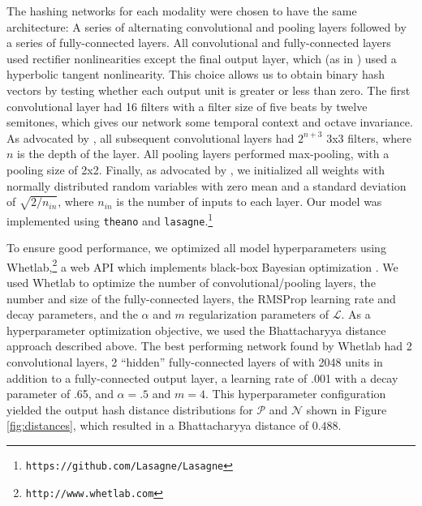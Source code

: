 \documentclass{article}
\begin{document}
The hashing networks for each modality were chosen to have the same architecture: A series of alternating convolutional and pooling layers followed by a series of fully-connected layers.
All convolutional and fully-connected layers used rectifier nonlinearities except the final output layer, which (as in \cite{masci2014multimodal}) used a hyperbolic tangent nonlinearity.
This choice allows us to obtain binary hash vectors by testing whether each output unit is greater or less than zero.
The first convolutional layer had 16 filters with a filter size of five beats by twelve semitones, which gives our network some temporal context and octave invariance.
As advocated by \cite{simonyan2014very}, all subsequent convolutional layers had $2^{n + 3}$ 3x3 filters, where $n$ is the depth of the layer.
All pooling layers performed max-pooling, with a pooling size of 2x2.
Finally, as advocated by \cite{he2015delving}, we initialized all weights with normally distributed random variables with zero mean and a standard deviation of $\sqrt{2/n_{in}}$, where $n_{in}$ is the number of inputs to each layer.
Our model was implemented using \texttt{theano} \cite{bastien2012theano} and \texttt{lasagne}.\footnote{\texttt{https://github.com/Lasagne/Lasagne}}

To ensure good performance, we optimized all model hyperparameters using Whetlab,\footnote{\texttt{http://www.whetlab.com}} a web API which implements black-box Bayesian optimization \cite{snoek2012practical}.
We used Whetlab to optimize the number of convolutional/pooling layers, the number and size of the fully-connected layers, the RMSProp learning rate and decay parameters, and the $\alpha$ and $m$ regularization parameters of $\mathcal{L}$.
As a hyperparameter optimization objective, we used the Bhattacharyya distance approach described above.
The best performing network found by Whetlab had 2 convolutional layers, 2 ``hidden'' fully-connected layers of with 2048 units in addition to a fully-connected output layer, a learning rate of .001 with a decay parameter of .65, and $\alpha = .5$ and $m = 4$.
This hyperparameter configuration yielded the output hash distance distributions for $\mathcal{P}$ and $\mathcal{N}$ shown in Figure \ref{fig:distances}, which resulted in a Bhattacharyya distance of $0.488$.
\end{document}
